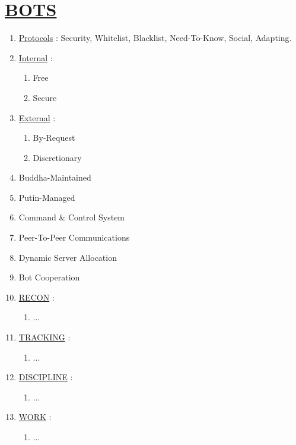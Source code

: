 \documentclass[11pt]{article}
\begin{document}
\section*{\ul{BOTS}}
\begin{enumerate}
	\item[] \ul{Protocols} : Security, Whitelist, Blacklist, Need-To-Know, Social, Adapting.

	\item[] \ul{Internal}  :
	\begin{enumerate}
		\item[] Free
		\item[] Secure
	\end{enumerate}
	
	\item[] \ul{External} :
	\begin{enumerate}
		\item[] By-Request
		\item[] Discretionary
	\end{enumerate}

	\item[] Buddha-Maintained
	\item[] Putin-Managed
	\item[] Command \& Control System
	\item[] Peer-To-Peer Communications
	\item[] Dynamic Server Allocation
	\item[] Bot Cooperation


	\item[] \ul{RECON} :
	\begin{enumerate}
	\item[] ...
	\end{enumerate}

	\item[] \ul{TRACKING} :
	\begin{enumerate}
		\item[] ...
	\end{enumerate}

	\item[] \ul{DISCIPLINE} :
	\begin{enumerate}
		\item[] ...
	\end{enumerate}

	\item[] \ul{WORK} :
	\begin{enumerate}
		\item[] ...
	\end{enumerate}


\end{enumerate}
\end{document}
